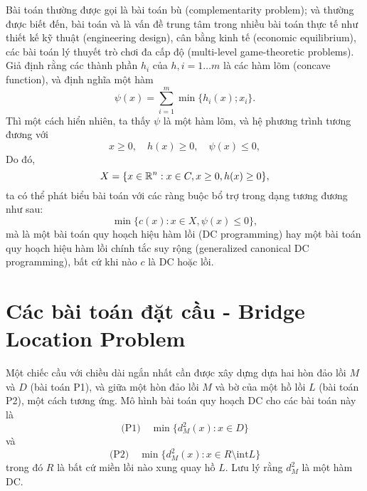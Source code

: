 \documentclass[a4paper]{report}
\begin{document}
    Bài toán  thường được gọi là bài toán bù (complementarity problem); và thường được biết đến, bài toán  và  là vấn đề trung tâm trong nhiều bài toán thực tế như thiết kế kỹ thuật (engineering design), cân bằng kinh tế (economic equilibrium), các bài toán lý thuyết trò chơi đa cấp độ (multi-level game-theoretic problems). Giả định rằng các thành phần $h_i$ của $h, i = 1\dots m$ là các hàm lõm (concave function), và định nghĩa một hàm 
    \begin{equation}
        \label{eq:psi_function}
        \psi(x) = \sum_{i=1}^m\min\{h_i(x); x_i\}.
    \end{equation}
    Thì một cách hiển nhiên, ta thấy $\psi$ là một hàm lõm, và hệ phương trình  tương đương với 
    \begin{equation}
        \label{eq:complementarity_equivalent}
        x \geq 0,\quad h(x) \geq 0,\quad \psi(x) \leq 0,
    \end{equation}
    Do đó, 
    \begin{equation}
        X = \{x \in \mathbb{R}^n: x \in C, x \geq 0, h(x) \geq 0\},
    \end{equation}
    ta có thể phát biểu bài toán  với các ràng buộc bổ trợ  trong dạng tương đương như sau:
    \begin{equation}
        \label{eq:complementarity_equivanlent_form}
        \min\{c(x): x \in X, \psi(x) \leq 0\},
    \end{equation}
    mà là một bài toán quy hoạch hiệu hàm lồi (DC programming) hay một bài toán quy hoạch hiệu hàm lồi chính tắc suy rộng (generalized canonical DC programming), bất cứ khi nào $c$ là DC hoặc lồi.
    \section{Các bài toán đặt cầu - Bridge Location Problem}
    Một chiếc cầu với chiều dài ngắn nhất cần được xây dựng dựa hai hòn đảo lồi $M$ và $D$ (bài toán P1), và giữa một hòn đảo lồi $M$ và bờ của một hồ lồi $L$ (bài toán P2), một cách tương ứng. Mô hình bài toán quy hoạch DC cho các bài toán này là 
    \begin{equation}
        \label{eq:bridge_problem_convex_1}
        \text{(P1)}\quad\min\{d_M^2(x): x \in D\}
    \end{equation}
    và 
    \begin{equation}
        \label{eq:bridge_problem_convex_2}
        \text{(P2)}\quad\min\{d_M^2(x): x \in R \setminus \text{int}L\}
    \end{equation}
    trong đó $R$ là bất cứ miền lồi nào xung quay hồ $L$. Lưu lý rằng $d^2_M$ là một hàm DC.
\end{document}
